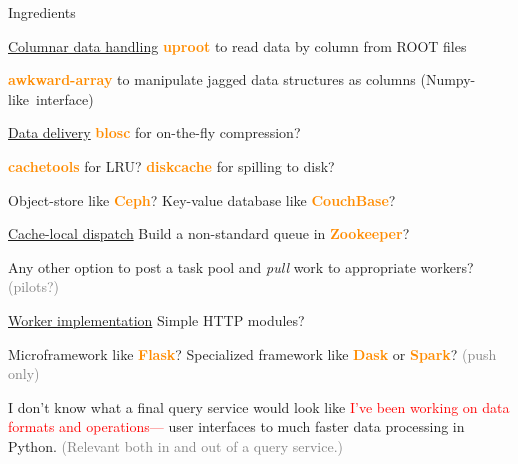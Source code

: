 \documentclass[aspectratio=169]{beamer}
\begin{document}
\begin{frame}{Ingredients}
\vspace{0.2 cm}
\begin{block}{\underline{Columnar data handling}}
\textcolor{darkorange}{\bf uproot} to read data by column from ROOT files

\textcolor{darkorange}{\bf awkward-array} to manipulate jagged data structures as columns \mbox{(Numpy-like interface)\hspace{-1 cm}}
\end{block}

\begin{block}{\underline{Data delivery}}
\textcolor{darkorange}{\bf blosc} for on-the-fly compression?

\textcolor{darkorange}{\bf cachetools} for LRU? \textcolor{darkorange}{\bf diskcache} for spilling to disk?

Object-store like \textcolor{darkorange}{\bf Ceph}? Key-value database like \textcolor{darkorange}{\bf CouchBase}?
\end{block}

\begin{block}{\underline{Cache-local dispatch}}
Build a non-standard queue in \textcolor{darkorange}{\bf Zookeeper}?

Any other option to post a task pool and {\it pull} work to appropriate workers? \textcolor{gray}{(pilots?)}
\end{block}

\begin{block}{\underline{Worker implementation}}
Simple HTTP modules?

Microframework like \textcolor{darkorange}{\bf Flask}? Specialized framework like \textcolor{darkorange}{\bf Dask} or \textcolor{darkorange}{\bf Spark}? \textcolor{gray}{(push only)}
\end{block}
\end{frame}

\begin{frame}{I don't know what a final query service would look like}
\large
\vspace{0.25 cm}
\textcolor{red}{I've been working on data formats and operations---} user interfaces to much faster data processing in Python. \textcolor{gray}{(Relevant both in and out of a query service.)}

\vspace{0.5 cm}
\begin{center}
\end{center}
\end{frame}
\end{document}
